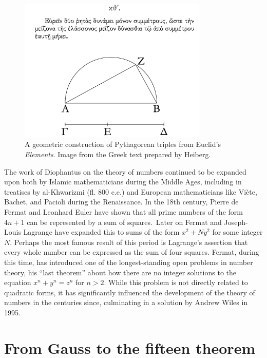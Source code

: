 \begin{figure}
    \centering
    \includegraphics[width=0.8\textwidth]{assets/euclid.png}
    \caption[A geometric construction of Pythagorean triples.]{A geometric construction of Pythagorean triples from Euclid's \emph{Elements}. Image from the Greek text prepared by Heiberg. \cite{heiberg1885euclid}}
    \label{fig:pythagorean-triples}
\end{figure}


The work of Diophantus on the theory of numbers continued to be expanded upon both by Islamic mathematicians during the Middle Ages, including in treatises by al-Khwarizmi (fl. 800 {\sc c.e.}) and European mathematicians like Vi\`ete, Bachet, and Pacioli during the Renaissance. In the 18th century, Pierre de Fermat and Leonhard Euler have shown that all prime numbers of the form \(4n + 1\) can be represented by a sum of squares.\,\cite{hahn2008quadratic} Later on Fermat and Joseph-Louis Lagrange have expanded this to sums of the form \(x^2 + Ny^2\) for some integer \(N\). Perhaps the most famous result of this period is Lagrange's assertion that every whole number can be expressed as the sum of four squares. Fermat, during this time, has introduced one of the longest-standing open problems in number theory, his ``last theorem'' about how there are no integer solutions to the equation \(x^n + y^n = z^n\) for \(n > 2\). While this problem is not directly related to quadratic forms, it has significantly influenced the development of the theory of numbers in the centuries since, culminating in a solution by Andrew Wiles in 1995. \cite{wiles1995modular}

\section{From Gauss to the fifteen theorem}

